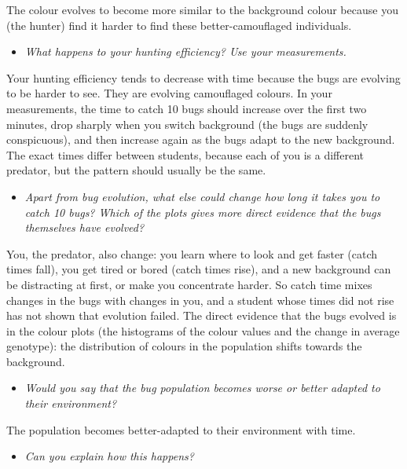 \documentclass[
  a4paper]{book}
\providecommand{\tightlist}{%
  \setlength{\itemsep}{0pt}\setlength{\parskip}{0pt}}
\begin{document}
The colour evolves to become more similar to the background colour because you (the hunter) find it harder to find these better-camouflaged individuals.

\begin{itemize}
\tightlist
\item
  \emph{What happens to your hunting efficiency? Use your measurements.}
\end{itemize}

Your hunting efficiency tends to decrease with time because the bugs are evolving to be harder to see. They are evolving camouflaged colours. In your measurements, the time to catch 10 bugs should increase over the first two minutes, drop sharply when you switch background (the bugs are suddenly conspicuous), and then increase again as the bugs adapt to the new background. The exact times differ between students, because each of you is a different predator, but the pattern should usually be the same.

\begin{itemize}
\tightlist
\item
  \emph{Apart from bug evolution, what else could change how long it takes you to catch 10 bugs? Which of the plots gives more direct evidence that the bugs themselves have evolved?}
\end{itemize}

You, the predator, also change: you learn where to look and get faster (catch times fall), you get tired or bored (catch times rise), and a new background can be distracting at first, or make you concentrate harder. So catch time mixes changes in the bugs with changes in you, and a student whose times did not rise has not shown that evolution failed. The direct evidence that the bugs evolved is in the colour plots (the histograms of the colour values and the change in average genotype): the distribution of colours in the population shifts towards the background.

\begin{itemize}
\tightlist
\item
  \emph{Would you say that the bug population becomes worse or better adapted to their environment?}
\end{itemize}

The population becomes better-adapted to their environment with time.

\begin{itemize}
\tightlist
\item
  \emph{Can you explain how this happens?}
\end{itemize}
\end{document}
